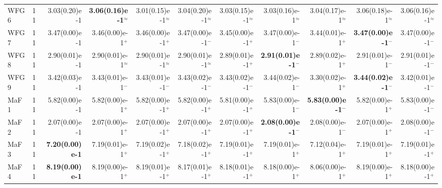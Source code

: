 \documentclass[pdflatex,sn-mathphys-ay]{sn-jnl}%
\theoremstyle{thmstyleone}%
\theoremstyle{thmstyletwo}%
\theoremstyle{thmstylethree}%
\begin{document}
\begin{landscape}
{\begin{longtable}{llrrrrrrrrr}
			WFG6                              & 11  & 3.03(0.20)e-1          & \textbf{3.06(0.16)e-1}$^{\approx}$ & 3.01(0.15)e-1$^{\approx}$    & 3.04(0.20)e-1$^{\approx}$ & 3.03(0.15)e-1$^{\approx}$    & 3.03(0.16)e-1$^{\approx}$          & 3.04(0.17)e-1$^{\approx}$    & 3.06(0.18)e-1$^{\approx}$    & 3.06(0.16)e-1$^{\approx}$ \\
			WFG7                              & 11  & 3.47(0.00)e-1          & 3.46(0.00)e-1$^{+}$                & 3.46(0.00)e-1$^{+}$          & 3.47(0.00)e-1$^{-}$       & 3.45(0.00)e-1$^{+}$          & 3.47(0.00)e-1$^{-}$                & 3.44(0.01)e-1$^{+}$          & \textbf{3.47(0.00)e-1}$^{-}$ & 3.47(0.00)e-1$^{-}$       \\
			WFG8                              & 11  & 2.90(0.01)e-1          & 2.90(0.01)e-1$^{\approx}$          & 2.90(0.01)e-1$^{\approx}$    & 2.90(0.01)e-1$^{\approx}$ & 2.89(0.01)e-1$^{+}$          & \textbf{2.91(0.01)e-1}$^{-}$       & 2.89(0.02)e-1$^{+}$          & 2.91(0.01)e-1$^{-}$          & 2.91(0.01)e-1$^{-}$       \\
			WFG9                              & 11  & 3.42(0.03)e-1          & 3.43(0.01)e-1$^{-}$                & 3.43(0.01)e-1$^{-}$          & 3.43(0.02)e-1$^{-}$       & 3.43(0.02)e-1$^{-}$          & 3.44(0.02)e-1$^{-}$                & 3.30(0.02)e-1$^{+}$          & \textbf{3.44(0.02)e-1}$^{-}$ & 3.42(0.01)e-1$^{-}$       \\
			\midrule
			MaF1                              & 11  & 5.82(0.00)e-1          & 5.82(0.00)e-1$^{+}$                & 5.82(0.00)e-1$^{+}$          & 5.82(0.00)e-1$^{+}$       & 5.81(0.00)e-1$^{+}$          & 5.83(0.00)e-1$^{-}$                & \textbf{5.83(0.00)e-1}$^{-}$ & 5.82(0.00)e-1$^{+}$          & 5.83(0.00)e-1$^{-}$       \\
			MaF2                              & 11  & 2.07(0.00)e-1          & 2.07(0.00)e-1$^{+}$                & 2.07(0.00)e-1$^{+}$          & 2.07(0.00)e-1$^{+}$       & 2.07(0.00)e-1$^{+}$          & \textbf{2.08(0.00)e-1}$^{-}$       & 2.08(0.00)e-1$^{-}$          & 2.07(0.00)e-1$^{+}$          & 2.08(0.00)e-1$^{-}$       \\
			MaF3                              & 11  & \textbf{7.20(0.00)e-1} & 7.19(0.01)e-1$^{+}$                & 7.19(0.02)e-1$^{+}$          & 7.18(0.02)e-1$^{+}$       & 7.19(0.01)e-1$^{+}$          & 7.19(0.01)e-1$^{+}$                & 7.12(0.04)e-1$^{+}$          & 7.19(0.01)e-1$^{+}$          & 7.19(0.01)e-1$^{+}$       \\
			MaF4                              & 11  & \textbf{8.19(0.00)e-1} & 8.19(0.00)e-1$^{+}$                & 8.19(0.01)e-1$^{+}$          & 8.17(0.01)e-1$^{+}$       & 8.18(0.01)e-1$^{+}$          & 8.18(0.00)e-1$^{+}$                & 8.06(0.00)e-1$^{+}$          & 8.19(0.00)e-1$^{+}$          & 8.18(0.00)e-1$^{+}$       \\

\end{longtable}}
\end{landscape}
\end{document}
